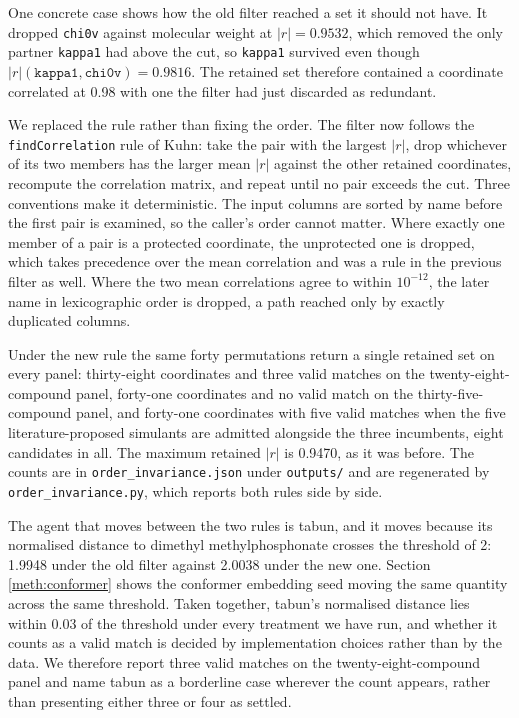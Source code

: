 \documentclass[journal=jacsat,manuscript=suppinfo,margin=1in]{achemso}
\begin{document}
One concrete case shows how the old filter reached a set it should not have. It
dropped \texttt{chi0v} against molecular weight at $|r| = 0.9532$, which removed
the only partner \texttt{kappa1} had above the cut, so \texttt{kappa1} survived
even though $|r|(\texttt{kappa1}, \texttt{chi0v}) = 0.9816$. The retained set
therefore contained a coordinate correlated at 0.98 with one the filter had just
discarded as redundant.

We replaced the rule rather than fixing the order. The filter now follows the
\texttt{findCorrelation} rule of Kuhn\cite{caretref}: take the pair with the
largest $|r|$, drop whichever of its two members has the larger mean $|r|$
against the other retained coordinates, recompute the correlation matrix, and
repeat until no pair exceeds the cut. Three conventions make it deterministic.
The input columns are sorted by name before the first pair is examined, so the
caller's order cannot matter. Where exactly one member of a pair is a protected
coordinate, the unprotected one is dropped, which takes precedence over the mean
correlation and was a rule in the previous filter as well. Where the two mean
correlations agree to within $10^{-12}$, the later name in lexicographic order
is dropped, a path reached only by exactly duplicated columns.

Under the new rule the same forty permutations return a single retained set on
every panel: thirty-eight coordinates and three valid matches on the
twenty-eight-compound panel, forty-one coordinates and no valid match on the
thirty-five-compound panel, and forty-one coordinates with five valid matches
when the five literature-proposed simulants are admitted alongside the three
incumbents, eight candidates in all. The maximum
retained $|r|$ is 0.9470, as it was before. The counts are in
\texttt{order\_invariance.json} under \texttt{outputs/} and are regenerated by
\texttt{order\_invariance.py}, which reports both rules side by side.

The agent that moves between the two rules is tabun, and it moves because its
normalised distance to dimethyl methylphosphonate crosses the threshold of 2:
1.9948 under the old filter against 2.0038 under the new one. Section
\ref{meth:conformer} shows the conformer embedding seed moving the same quantity
across the same threshold. Taken together, tabun's normalised distance lies
within 0.03 of the threshold under every treatment we have run, and whether it
counts as a valid match is decided by implementation choices rather than by the
data. We therefore report three valid matches on the twenty-eight-compound panel
and name tabun as a borderline case wherever the count appears, rather than
presenting either three or four as settled.
\end{document}
